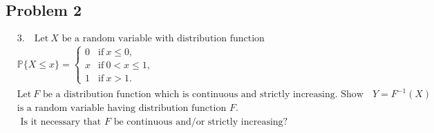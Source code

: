 \documentclass[letterpaper, 11pt]{article}
\newcommand{\1}{\mathds{1}}	%
\theoremstyle{definition}
\begin{document}
\subsection*{Problem 2}
\begin{align*}
    & 3.\quad\mathrm{Let~}X\text{ be a random variable with distribution function} \\
    & \mathbb{P}\{X\leq x\}=\left\{
   \begin{array}
   {ll}0 & \mathrm{if~}x\leq0, \\
   x & \mathrm{if~}0<x\leq1, \\
   1 & \mathrm{if~}x>1.
   \end{array}\right. \\
    & \mathrm{Let~}F\text{ be a distribution function which is continuous and strictly increasing. Show that }Y=F^{-1}(X) \\
    & \text{is a random variable having distribution function }F.\\
    & \text{ Is it necessary that }F\text{ be continuous and/or strictly}\text{ increasing?}
   \end{align*}
\end{document}
